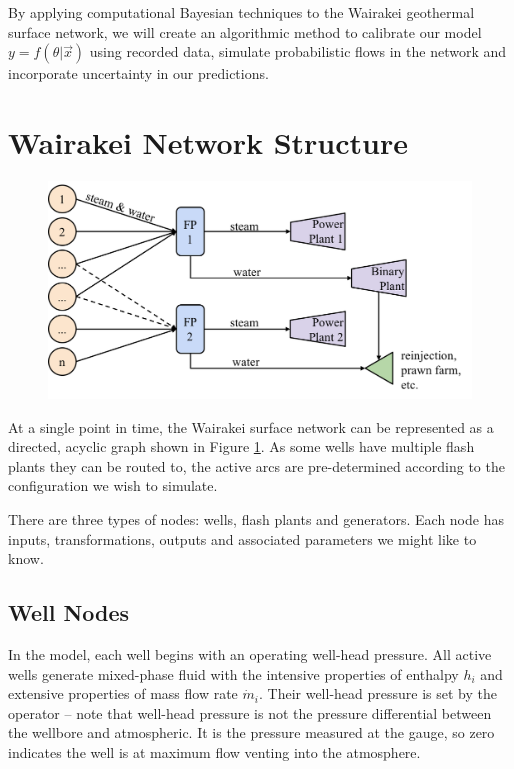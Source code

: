 \documentclass[a4paper, 12pt]{article}
\begin{document}
By applying computational Bayesian techniques to the Wairakei geothermal surface network, we will create an algorithmic method to calibrate our model $y=f(\theta|\vec{x})$ using recorded data, simulate probabilistic flows in the network and incorporate uncertainty in our predictions.

\section{Wairakei Network Structure}

\begin{figure}
  \centering
  \includegraphics[width=0.5\linewidth]{media/network_diagram}
  \label{fig:network_diagram}
\end{figure}

At a single point in time, the Wairakei surface network can be represented as a directed, acyclic graph shown in Figure \ref{fig:network_diagram}. As some wells have multiple flash plants they can be routed to, the active arcs are pre-determined according to the configuration we wish to simulate.

There are three types of nodes: wells, flash plants and generators. Each node has inputs, transformations,  outputs and associated parameters we might like to know.

\subsection{Well Nodes}
In the model, each well begins with an operating well-head pressure. All active wells generate mixed-phase fluid with the intensive properties of enthalpy $h_i$ and extensive properties of mass flow rate $\dot{m}_i$. Their well-head pressure is set by the operator -- note that well-head pressure is not the pressure differential between the wellbore and atmospheric. It is the pressure measured at the gauge, so zero indicates the well is at maximum flow venting into the atmosphere.
\end{document}

